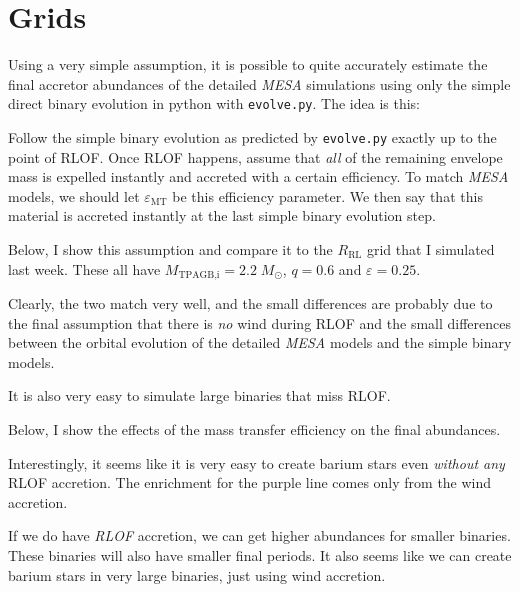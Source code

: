 \documentclass[a4paper,10pt]{article}
\begin{document}
\section{Grids}

Using a very simple assumption, it is possible to quite accurately estimate the final accretor
abundances of the detailed \emph{MESA} simulations using only the simple direct binary evolution
in python with \lstinline[style=output, breaklines=true]|evolve.py|.
The idea is this:

Follow the simple binary evolution as predicted by \lstinline[style=output, breaklines=true]|evolve.py| exactly up to the point of RLOF.
Once RLOF happens, assume that \emph{all} of the remaining envelope mass is expelled instantly and accreted with a certain efficiency.
To match \emph{MESA} models, we should let \(\varepsilon_\text{MT}\) be this efficiency parameter.
We then say that this material is accreted instantly at the last simple binary evolution step.

Below, I show this assumption and compare it to the \(R_\text{RL}\) grid that I simulated last week.
These all have \(M_\text{TPAGB,i} = 2.2\; M_\odot \), \(q=0.6\) and \(\varepsilon =0.25\).
\begin{figure}[ht]
	\centering
\end{figure}

Clearly, the two match very well, and the small differences are probably due to the final assumption that there is \emph{no} wind during RLOF and the small
differences between the orbital evolution of the detailed \emph{MESA} models and the simple binary models.

It is also very easy to simulate large binaries that miss RLOF.

Below, I show the effects of the mass transfer efficiency on the final abundances.

\begin{figure}[ht]
	\centering
\end{figure}

Interestingly, it seems like it is very easy to create barium stars even \emph{without any} RLOF
accretion.
The enrichment for the purple line comes only from the wind accretion.

If we do have \emph{RLOF} accretion, we can get higher abundances for smaller binaries.
These binaries will also have smaller final periods.
It also seems like we can create barium stars in very large binaries, just using wind accretion.
\end{document}
